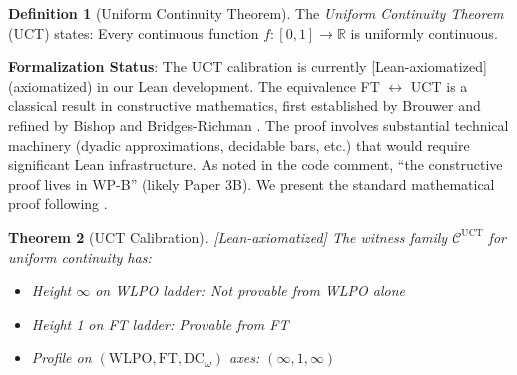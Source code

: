 \documentclass[11pt]{article}
\theoremstyle{plain}
\newtheorem{theorem}{Theorem}[section]
\theoremstyle{definition}
\newtheorem{definition}[theorem]{Definition}
\newcommand{\R}{\mathbb{R}}
\newcommand{\WLPO}{\mathrm{WLPO}}
\newcommand{\FT}{\mathrm{FT}}
\newcommand{\DCw}{\mathrm{DC}_\omega}
\newcommand{\UCT}{\mathrm{UCT}}
\newcommand{\leanaxiom}{\textsf{\textcolor{orange!80!black}{[Lean-axiomatized]}}}
\begin{document}
\begin{definition}[Uniform Continuity Theorem]\label{def:uct}
The \emph{Uniform Continuity Theorem} (UCT) states: Every continuous function $f: [0,1] \to \R$ is uniformly continuous.
\end{definition}

\begin{warningbox}
\textbf{Formalization Status}: The UCT calibration is currently \leanaxiom{} (axiomatized) in our Lean development. The equivalence FT $\leftrightarrow$ UCT is a classical result in constructive mathematics, first established by Brouwer and refined by Bishop \cite{Bishop1967} and Bridges-Richman \cite{BridgesRichman1987}. The proof involves substantial technical machinery (dyadic approximations, decidable bars, etc.) that would require significant Lean infrastructure. As noted in the code comment, ``the constructive proof lives in WP-B'' (likely Paper 3B). We present the standard mathematical proof following \cite{BridgesVita2006}.
\end{warningbox}

\begin{theorem}[UCT Calibration]\label{thm:uct-calib} \leanaxiom
The witness family $\mathcal{C}^{\UCT}$ for uniform continuity has:
\begin{itemize}
\item Height $\infty$ on WLPO ladder: Not provable from WLPO alone
\item Height 1 on FT ladder: Provable from FT
\item Profile on $(\WLPO, \FT, \DCw)$ axes: $(\infty, 1, \infty)$
\end{itemize}
\end{theorem}
\end{document}

